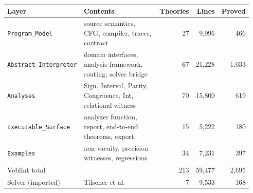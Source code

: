 \begin{tabular}{@{}lp{}rrr@{}}
\toprule
Layer & Contents & Theories & Lines & Proved \\
\midrule
\texttt{Program\_Model} & source semantics, CFG, compiler, traces, contract & 27 & 9{,}996 & 466 \\
\texttt{Abstract\_Interpreter} & domain interfaces, analysis framework, routing, solver bridge & 67 & 21{,}228 & 1{,}033 \\
\texttt{Analyses} & Sign, Interval, Parity, Congruence, Int, relational witness & 70 & 15{,}800 & 619 \\
\texttt{Executable\_Surface} & analyzer function, report, end-to-end theorems, export & 15 & 5{,}222 & 180 \\
\texttt{Examples} & non-vacuity, precision witnesses, regressions & 34 & 7{,}231 & 397 \\
\midrule
Voblint total & & 213 & 59{,}477 & 2{,}695 \\
Solver (imported) & Tilscher et al.~\cite{tilscher26} & 7 & 9{,}533 & 168 \\
\bottomrule
\end{tabular}

